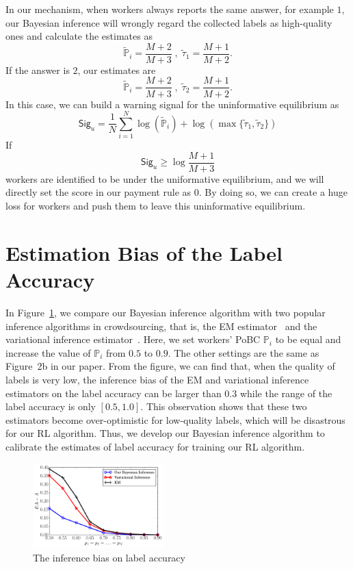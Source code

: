 \documentclass{article}
\begin{document}
In our mechanism, when workers always reports the same answer, for example $1$, our Bayesian inference will 
wrongly regard the collected labels as high-quality ones and calculate the estimates as
\begin{equation}
\tilde{\mathbb{P}}_i=\frac{M+2}{M+3}\;,\;\tilde{\tau}_1=\frac{M+1}{M+2}.
\end{equation}
If the answer is $2$, our estimates are
\begin{equation}
\tilde{\mathbb{P}}_i=\frac{M+2}{M+3}\;,\;\tilde{\tau}_2=\frac{M+1}{M+2}.
\end{equation}
In this case, we can build a warning signal for the uninformative equilibrium as
\begin{equation}
\mathsf{Sig}_u = \frac{1}{N}\sum_{i=1}^{N}\log(\tilde{\mathbb{P}}_i)+\log(\max\{\tilde{\tau}_1,\tilde{\tau}_2 \})
\end{equation}
If
\begin{equation}
\mathsf{Sig}_u\geq \log\frac{M+1}{M+3}
\end{equation}
workers are identified to be under the uniformative equilibrium, and we will directly set the score in our payment rule as $0$.
By doing so, we can create a huge loss for workers and push them to leave this uninformative equilibrium.

\section{Estimation Bias of the Label Accuracy}
In Figure~\ref{BIM}, we compare our Bayesian inference algorithm with two popular inference algorithms in crowdsourcing, that is, the EM estimator~\cite{raykar2010learning} and the variational inference estimator~\cite{liu2012variational}.
Here, we set workers' PoBC $\mathbb{P}_i$ to be equal and increase the value of $\mathbb{P}_i$ from $0.5$ to $0.9$.
The other settings are the same as Figure~2b in our paper.
From the figure, we can find that, when the quality of labels is very low, the inference bias of the EM and variational inference estimators on the label accuracy can be larger than $0.3$ while the range of the label accuracy is only $[0.5,1.0]$.
This observation shows that these two estimators become over-optimistic for low-quality labels, which will be disastrous for our RL algorithm.
Thus, we develop our Bayesian inference algorithm to calibrate the estimates of label accuracy for training our RL algorithm.
\begin{figure}[!htb]
    \centering
    \includegraphics[width=0.45\textwidth]{image/EXPC1}
    \caption{\label{BIM}The inference bias on label accuracy}
\end{figure}





\end{document}
